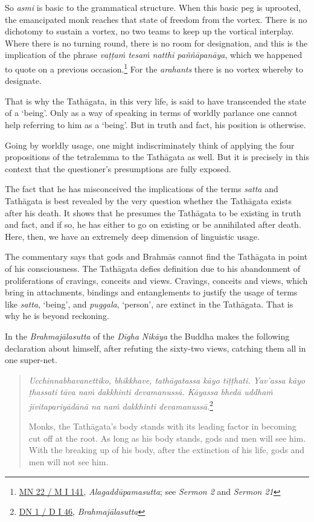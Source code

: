 So \emph{asmi} is basic to the grammatical structure. When this basic peg is uprooted, the emancipated monk reaches that state of freedom from the vortex. There is no dichotomy to sustain a vortex, no two teams to keep up the vortical interplay. Where there is no turning round, there is no room for designation, and this is the implication of the phrase \emph{vaṭṭaṁ tesaṁ natthi paññāpanāya}, which we happened to quote on a previous occasion.\footnote{\href{https://suttacentral.net/mn22/pli/ms}{MN 22 / M I 141}, \emph{Alagaddūpamasutta}; see \emph{Sermon 2} and \emph{Sermon 21}} For the \emph{arahants} there is no vortex whereby to designate.

That is why the Tathāgata, in this very life, is said to have transcended the state of a `being'. Only as a way of speaking in terms of worldly parlance one cannot help referring to him as a `being'. But in truth and fact, his position is otherwise.

Going by worldly usage, one might indiscriminately think of applying the four propositions of the tetralemma to the Tathāgata as well. But it is precisely in this context that the questioner's presumptions are fully exposed.

The fact that he has misconceived the implications of the terms \emph{satta} and Tathāgata is best revealed by the very question whether the Tathāgata exists after his death. It shows that he presumes the Tathāgata to be existing in truth and fact, and if so, he has either to go on existing or be annihilated after death. Here, then, we have an extremely deep dimension of linguistic usage.

The commentary says that gods and Brahmās cannot find the Tathāgata in point of his consciousness. The Tathāgata defies definition due to his abandonment of proliferations of cravings, conceits and views. Cravings, conceits and views, which bring in attachments, bindings and \mbox{entanglements} to justify the usage of terms like \emph{satta}, `being', and \emph{puggala}, `person', are extinct in the Tathāgata. That is why he is beyond reckoning.

In the \emph{Brahmajālasutta} of the \emph{Dīgha Nikāya} the Buddha makes the following declaration about himself, after refuting the sixty-two views, catching them all in one super-net.

\begin{quote}
\emph{Ucchinnabhavanettiko, bhikkhave, tathāgatassa kāyo tiṭṭhati. Yav'assa kāyo ṭhassati tāva naṁ dakkhinti devamanussā. Kāyassa bhedā uddhaṁ jīvitapariyādānā na naṁ dakkhinti devamanussā.}\footnote{\href{https://suttacentral.net/dn1/pli/ms}{DN 1 / D I 46}, \emph{Brahmajālasutta}}

Monks, the Tathāgata's body stands with its leading factor in becoming cut off at the root. As long as his body stands, gods and men will see him. With the breaking up of his body, after the extinction of his life, gods and men will not see him.
\end{quote}

